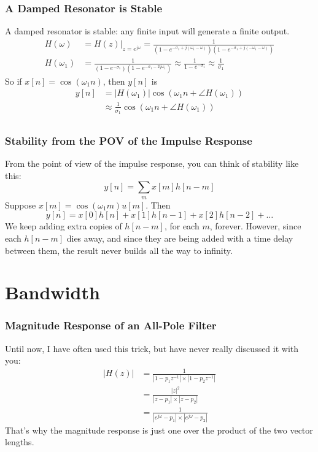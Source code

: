 \documentclass{beamer}
\begin{document}
\begin{frame}
  \frametitle{A Damped Resonator is Stable}

  A damped resonator is stable: any finite input will generate a
  finite output.  
  \begin{align*}
    H(\omega) &= H(z)\vert_{z=e^{j\omega}} = \frac{1}{(1-e^{-\sigma_1+j(\omega_1-\omega)})(1-e^{-\sigma_1+j(-\omega_1-\omega)})}\\
    H(\omega_1) &= \frac{1}{(1-e^{-\sigma_1})(1-e^{-\sigma_1-2j\omega_1})}\approx
    \frac{1}{1-e^{-\sigma_1}}\approx \frac{1}{\sigma_1}
  \end{align*}
  So if $x[n]=\cos(\omega_1 n)$, then $y[n]$ is
  \begin{align*}
    y[n] &= |H(\omega_1)|\cos\left(\omega_1 n+\angle H(\omega_1)\right) \\
    &\approx  \frac{1}{\sigma_1}\cos\left(\omega_1 n+\angle H(\omega_1)\right) \\
  \end{align*}
\end{frame}

\begin{frame}
  \centerline{}
\end{frame}

\begin{frame}
  \frametitle{Stability from the POV of the Impulse Response}
  From the point of view of the impulse response, you can think of stability like this:
  \[
  y[n] = \sum_m x[m]h[n-m]
  \]
  Suppose $x[m] = \cos(\omega_1 m)u[m]$.   Then
  \[
  y[n] = x[0]h[n] + x[1]h[n-1] + x[2]h[n-2] + \ldots
  \]
  We keep adding extra copies of $h[n-m]$, for each $m$, forever.
  However, since each $h[n-m]$ dies away, and since they are
  being added with a time delay between them, the result never builds
  all the way to infinity.
\end{frame}

\begin{frame}
  \centerline{}
\end{frame}
  

\section[Bandwidth]{Bandwidth}
\setcounter{subsection}{1}

\begin{frame}
  \frametitle{Magnitude Response of an All-Pole Filter}

  Until now, I have often used this trick, but have never really
  discussed it with you:
  \begin{align*}
    |H(z)| &= \frac{1}{|1-p_1z^{-1}|\times |1-p_2z^{-1}|}\\
    &= \frac{|z|^2}{|z-p_1|\times |z-p_2|} \\
    & =\frac{1}{|e^{j\omega}-p_1|\times |e^{j\omega}-p_2|}
  \end{align*}
  That's why the magnitude response is just one over the product of the two vector lengths.
\end{frame}
\end{document}
